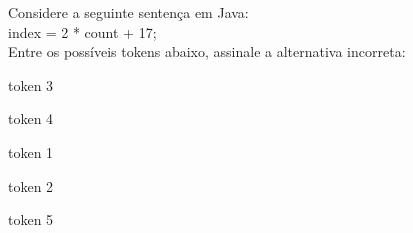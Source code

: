 \question[10]

Considere a seguinte sentença em Java:\\
index = 2 * count + 17;\\
Entre os possíveis tokens abaixo, assinale a alternativa incorreta:\\
\begin{choices}
\item token 3 
\item token 4
\item token 1 
\item token 2
\item token 5 %
\end{choices}
\answerline

